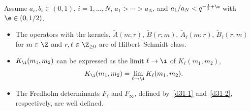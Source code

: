 \begin{Proposition}\label{p33}
Assume $a_i,b_i\in(0,1)$, $i=1,\dots,N$, $a_1>\cdots>a_N$, and $a_{1}/a_{N}<q^{-\frac12+\e}$ with $\e\in(0,1/2)$.
\begin{itemize}\itemsep=0pt
 \item[{\rm (i)}]
The operators with
the kernels, $\tilde{A}(m;r)$, $\tilde{B}(r;m)$,
$\tilde{A}_\ell(m;r)$, $\tilde{B}_\ell(r;m)$
for $m\in\Z$ and $r,\ell\in\Z_{\ge 0}$
are of Hilbert--Schmidt class.
 \item[{\rm (ii)}] $K_{\i}(m_1,m_2)$
 can be expressed as the limit $\ell\rightarrow\i$ of $K_{\ell}(m_1,m_2)$,
 \begin{equation}
 \label{p33-1}
 K_{\i}(m_1,m_2)=\lim_{\ell\rightarrow\i}K_\ell(m_1,m_2).
 \end{equation}
 \item[{\rm (iii)}]
 The Fredholm determinants $F_\ell $ and $F_{\infty}$, defined by~\eqref{d31-1} and~\eqref{d31-2}, respectively, are well defined.
\end{itemize}
\end{Proposition}
